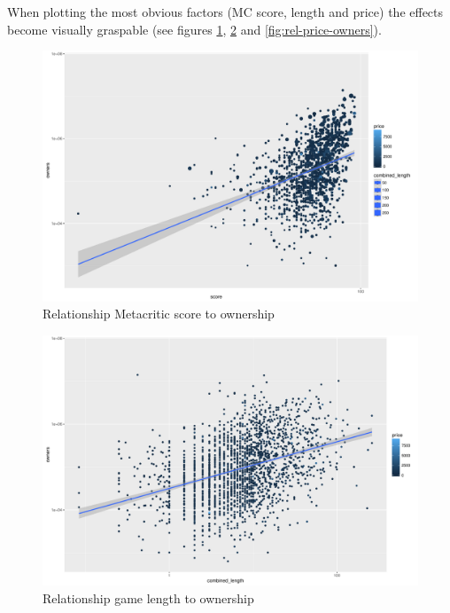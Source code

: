 When plotting the most obvious factors (MC score, length and price) the effects become visually graspable (see figures \ref{fig:rel-score-owners}, \ref{fig:rel-combinedlength-owners} and \ref{fig:rel-price-owners}).

\begin{figure}[!t]
	\centering
	\includegraphics[width=1.0\columnwidth]{images/rel-score-owners.pdf}
	\caption{Relationship Metacritic score to ownership}
\label{fig:rel-score-owners}
\end{figure}

\begin{figure}[!t]
	\centering
	\includegraphics[width=1.0\columnwidth]{images/rel-combinedlength-owners.pdf}
	\caption{Relationship game length to ownership}
\label{fig:rel-combinedlength-owners}
\end{figure}

